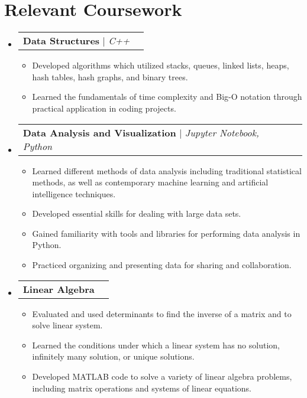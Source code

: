 \documentclass[letterpaper,11pt]{article}
\makeatletter
\newcommand{\resumeItem}[1]{
  \item\small{
    {#1 \vspace{-2pt}}
  }
}
\newcommand{\resumeProjectHeading}[2]{
    \item
    \begin{tabular*}{1.001\textwidth}{l@{\extracolsep{\fill}}r}
      \small#1 & \textbf{\small #2}\\
    \end{tabular*}\vspace{-7pt}
}
\newcommand{\resumeSubHeadingListStart}{\begin{itemize}[leftmargin=0.0in, label={}]}
\newcommand{\resumeSubHeadingListEnd}{\end{itemize}}
\newcommand{\resumeItemListStart}{\begin{itemize}}
\newcommand{\resumeItemListEnd}{\end{itemize}\vspace{-5pt}}
\makeatother
\begin{document}
\section{Relevant Coursework}
    \vspace{-5pt}
    \resumeSubHeadingListStart
      \resumeProjectHeading
          {\textbf{Data Structures} $|$ \emph{C++}}{}
          \resumeItemListStart
            \resumeItem{Developed algorithms which utilized stacks, queues, linked lists, heaps, hash tables, hash graphs, and binary trees.}
            \resumeItem{Learned the fundamentals of time complexity and Big-O notation through practical application in coding projects.}
          \resumeItemListEnd
          \vspace{-13pt}
      \resumeProjectHeading
          {\textbf{Data Analysis and Visualization} $|$ \emph{Jupyter Notebook, Python} }{}
          \resumeItemListStart
            \resumeItem{Learned different methods of data analysis including traditional statistical methods, as well as contemporary machine learning and artificial intelligence techniques.}
            \resumeItem{Developed essential skills for dealing with large data sets.}
            \resumeItem{Gained familiarity with tools and libraries for performing data analysis in Python.}
            \resumeItem{Practiced organizing and presenting data for sharing and collaboration.}
          \resumeItemListEnd 
          \vspace{-13pt}
          \resumeProjectHeading
          {\textbf{Linear Algebra}}{}
          \resumeItemListStart
            \resumeItem{Evaluated and used determinants to find the inverse of a matrix and to solve linear system.}
            \resumeItem{Learned the conditions under which a linear system has no solution, infinitely many solution, or unique solutions.}
            \resumeItem{Developed MATLAB code to solve a variety of linear algebra problems, including matrix operations and systems of linear equations.}
          \resumeItemListEnd 
    \resumeSubHeadingListEnd
\vspace{-15pt}
\end{document}
